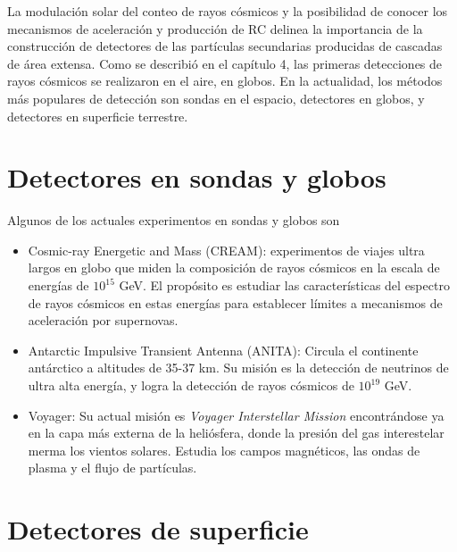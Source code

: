 \documentclass{book}
\begin{document}
La modulaci\'on solar del conteo de rayos c\'osmicos y la posibilidad de conocer los mecanismos de aceleraci\'on y producci\'on de RC delinea la importancia de la construcci\'on de detectores de las part\'iculas secundarias producidas de cascadas de \'area extensa. Como se describi\'o en el cap\'itulo 4, las primeras detecciones de rayos c\'osmicos se realizaron en el aire, en globos. En la actualidad, los  m\'etodos m\'as populares de detecci\'on son sondas en el espacio, detectores en globos, y detectores en superficie terrestre. \citep{BERN}

\section{Detectores en sondas y globos}

Algunos de los actuales experimentos en sondas y globos son
\begin{itemize}
\item Cosmic-ray Energetic and Mass (CREAM): experimentos de viajes ultra largos en globo que miden la composici\'on de rayos c\'osmicos en la escala de energ\'ias de $10^{15}$ GeV. El prop\'osito es estudiar las caracter\'isticas del espectro de rayos c\'osmicos en estas energ\'ias para establecer l\'imites a mecanismos de aceleraci\'on por supernovas. \citep{SEO}
\item Antarctic Impulsive Transient Antenna (ANITA): Circula el continente ant\'arctico a altitudes de 35-37 km. Su misi\'on es la detecci\'on de neutrinos de ultra alta energ\'ia, y logra la detecci\'on de rayos c\'osmicos de $10^{19}$ GeV. \citep{HOOVER}
\item Voyager: Su actual misi\'on es \textit{Voyager Interstellar Mission} encontr\'andose ya en la capa m\'as externa de la heli\'osfera, donde la presi\'on del gas interestelar merma los vientos solares. Estudia los campos magn\'eticos, las ondas de plasma y el flujo de part\'iculas.
\end{itemize}

\section{Detectores de superficie}
\end{document}
